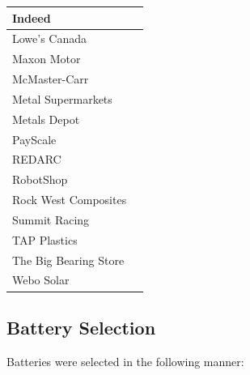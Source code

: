 \begin{center}
\begin{longtable}{ l c }
         Indeed & \cite{indeed_indeed_nodate} 
         \\ \hline
         Lowe's Canada & \cite{lowes_canada_lowes_nodate} 
         \\ \hline
         Maxon Motor & \cite{maxon_motor_maxon_nodate} 
         \\ \hline
         McMaster-Carr & \cite{mcmaster-carr_mcmaster-carr_nodate}
         \\ \hline
         Metal Supermarkets & \cite{metal_supermarkets_metal_nodate} 
         \\ \hline
         Metals Depot & \cite{metals_depot_metals_nodate}
         \\ \hline
         PayScale & \cite{payscale_payscale_nodate}
         \\ \hline
         REDARC & \cite{redarc_electronics_redarc_nodate}
         \\ \hline
         RobotShop & \cite{robots_shop_robotshop_nodate} 
         \\ \hline
         Rock West Composites & \cite{rock_west_composites_rock_nodate} 
         \\ \hline
         Summit Racing & \cite{summit_racing_summit_nodate} 
         \\ \hline
         TAP Plastics & \cite{tap_plastics_tap_nodate} 
         \\ \hline
         The Big Bearing Store & \cite{the_big_bearing_store_big_nodate} 
         \\ \hline
         Webo Solar & \cite{webo_solar_webo_nodate} 
         \\ \hline
    \end{longtable}
\end{center}

\subsection{Battery Selection}

Batteries were selected in the following manner:

